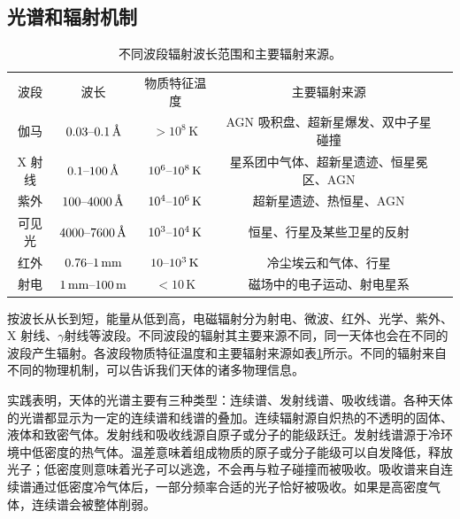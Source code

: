 \documentclass[../天体物理基础.tex]{subfiles}
\begin{document}
\subsection{光谱和辐射机制}
\begin{table}[!htbp]
\centering
\caption{不同波段辐射波长范围和主要辐射来源。}
\begin{tabular}{c c c c c}
\hline
波段 & 波长 & 物质特征温度 & 主要辐射来源\\
\cline{1-4}
伽马 & $0.03\text{\textendash}0.1\,\si{\angstrom}$ & $>10^{8}\,\mathrm{K}$ & AGN 吸积盘、超新星爆发、双中子星碰撞\\
\cline{1-4}
X 射线 & $0.1\text{\textendash}100\,\si{\angstrom}$ & $10^{6}\text{\textendash}10^{8}\,\mathrm{K}$ & 星系团中气体、超新星遗迹、恒星冕区、AGN\\
\cline{1-4}
紫外 & $100\text{\textendash}4000\,\si{\angstrom}$ & $10^{4}\text{\textendash}10^{6}\,\mathrm{K}$ & 超新星遗迹、热恒星、AGN\\
\cline{1-4}
可见光 & $4000\text{\textendash}7600\,\si{\angstrom}$ & $10^{3}\text{\textendash}10^{4}\,\mathrm{K}$ & 恒星、行星及某些卫星的反射\\
\cline{1-4}
红外 & $0.76\text{\textendash}1\,\mathrm{mm}$ & $10\text{\textendash}10^{3}\,\mathrm{K}$ & 冷尘埃云和气体、行星\\
\cline{1-4}
射电 & $1\,\mathrm{mm}\text{\textendash}100\,\mathrm{m}$ & $<10\,\mathrm{K}$ & 磁场中的电子运动、射电星系\\
\cline{1-4}
\end{tabular}
\label{不同波段辐射波长范围和主要辐射来源。}
\end{table}

按波长从长到短，能量从低到高，电磁辐射分为射电、微波、红外、光学、紫外、X 射线、$\gamma$射线等波段。不同波段的辐射其主要来源不同，同一天体也会在不同的波段产生辐射。各波段物质特征温度和主要辐射来源如表\ref{不同波段辐射波长范围和主要辐射来源。}所示。不同的辐射来自不同的物理机制，可以告诉我们天体的诸多物理信息。

实践表明，天体的光谱主要有三种类型：连续谱、发射线谱、吸收线谱。各种天体的光谱都显示为一定的连续谱和线谱的叠加。连续辐射源自炽热的不透明的固体、液体和致密气体。发射线和吸收线源自原子或分子的能级跃迁。发射线谱源于冷环境中低密度的热气体。温差意味着组成物质的原子或分子能级可以自发降低，释放光子；低密度则意味着光子可以逃逸，不会再与粒子碰撞而被吸收。吸收谱来自连续谱通过低密度冷气体后，一部分频率合适的光子恰好被吸收。如果是高密度气体，连续谱会被整体削弱。
\end{document}
